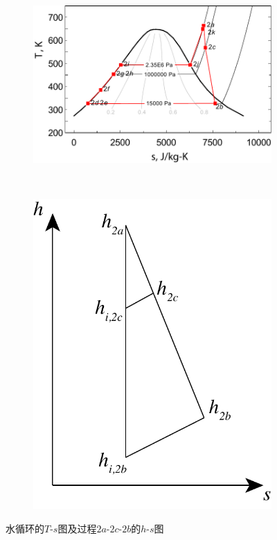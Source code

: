 \noindent \begin{figure}[htbp]
\centering
	\begin{subfigure}[b]{0.6\columnwidth}
	\includegraphics[width = \columnwidth]{fig/T-s_Water.pdf}
	\caption{}\label{fig:Ts_Water}
	\end{subfigure}
	~
\begin{subfigure}[b]{0.3\columnwidth}
	\includegraphics[width = \columnwidth]{fig/SteamTurbine_hs.pdf}
	\caption{}\label{fig:SteamTurbine_hs}
	\end{subfigure}
	
	\caption{水循环的$T$-$s$图及过程$2a$-$2c$-$2b$的$h$-$s$图}\label{fig:SteamTurbine_hs_p}
\end{figure}

